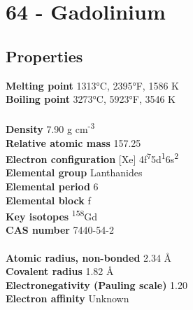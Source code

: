 \section{64 - Gadolinium}
\label{sec:elem-gadolinium}
\subsection{Properties}
\textbf{Melting point} 1313°C, 2395°F, 1586 K\\
\textbf{Boiling point} 3273°C, 5923°F, 3546 K\\
\\
\textbf{Density} 7.90  g cm\textsuperscript{-3}\\
\textbf{Relative atomic mass} 157.25\\
\textbf{Electron configuration} [Xe] 4f\textsuperscript{7}5d\textsuperscript{1}6s\textsuperscript{2}\\
\textbf{Elemental group} Lanthanides\\
\textbf{Elemental period} 6\\
\textbf{Elemental block} f\\
\textbf{Key isotopes} \textsuperscript{158}Gd\\
\textbf{CAS number} 7440-54-2\\
\\
\textbf{Atomic radius, non-bonded} 2.34 Å\\
\textbf{Covalent radius} 1.82 Å\\
\textbf{Electronegativity (Pauling scale)} 1.20\\
\textbf{Electron affinity} Unknown\\